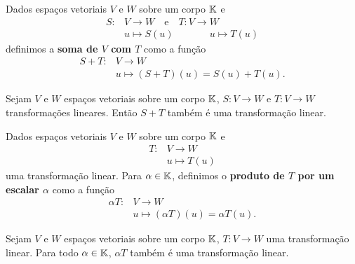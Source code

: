 \documentclass{beamer}
\begin{document}
\begin{frame}
    \begin{definicao}
        Dados espaços vetoriais $V$ e $W$ sobre um corpo $\mathbb{K}$ e
        \begin{align*}
            S \colon &V \to W \quad \mbox{e}\quad T \colon V \to W\\
                     &u \mapsto S(u)\quad \mbox{ }\quad \quad u \mapsto T(u)
        \end{align*}
        definimos a \textbf{soma de $V$ com $T$} como a função
        \begin{align*}
            S + T \colon &V \to W\\
                         &u \mapsto (S + T)(u) = S(u) + T(u).
        \end{align*}
    \end{definicao}
\end{frame}

\begin{frame}
    \begin{proposicao}
        Sejam $V$ e $W$ espaços vetoriais sobre um corpo $\mathbb{K}$, $S \colon V \to W$ e $T \colon V \to W$ transformações lineares. Então $S + T$ também é uma transformação linear.
    \end{proposicao}
\end{frame}

\begin{frame}
    \begin{definicao}
        Dados espaços vetoriais $V$ e $W$ sobre um corpo $\mathbb{K}$ e
        \begin{align*}
            T \colon &V \to W\\
                     &u \mapsto T(u)
        \end{align*}
        uma transformação linear. Para $\alpha \in \mathbb{K}$, definimos o \textbf{produto de $T$ por um escalar $\alpha$} como a função
        \begin{align*}
            \alpha T \colon &V \to W\\
                            &u \mapsto (\alpha T)(u) = \alpha T(u).
        \end{align*}
    \end{definicao}
\end{frame}

\begin{frame}
    \begin{proposicao}
        Sejam $V$ e $W$ espaços vetoriais sobre um corpo $\mathbb{K}$, $T \colon V \to W$ uma transformação linear. Para todo $\alpha \in \mathbb{K}$, $\alpha T$ também é uma transformação linear.
    \end{proposicao}
\end{frame}
\end{document}
